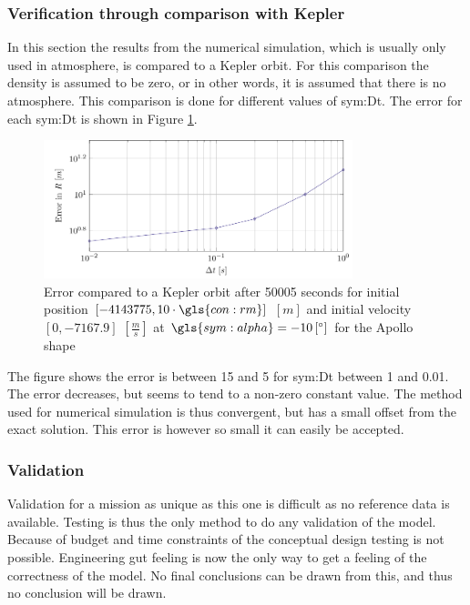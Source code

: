 \subsubsection{Verification through comparison with Kepler}
\label{sec:astroverf}

In this section the results from the numerical simulation, which is usually only used in atmosphere, is compared to a Kepler orbit. For this comparison the density is assumed to be zero, or in other words, it is assumed that there is no atmosphere. This comparison is done for different values of \gls{sym:Dt}. The error for each \gls{sym:Dt} is shown in Figure \ref{fig:kep_error}.

\begin{figure}[h]
	\centering
	\includegraphics[width=0.8\textwidth]{Figure/orbital_model/num_kep.pdf}
	\caption{Error compared to a Kepler orbit after 50005 seconds for initial position $\left[-4143775,10\cdot\gls{con:rm}\right]$ $\left[m\right]$ and initial velocity $\left[0,-7167.9\right]$ $\left[\frac{m}{s}\right]$ at $\gls{sym:alpha}=-10\left[^\circ\right]$ for the Apollo shape}
	\label{fig:kep_error}
\end{figure}

The figure shows the error is between 15 and 5 for \gls{sym:Dt} between 1 and 0.01. The error decreases, but seems to tend to a non-zero constant value. The method used for numerical simulation is thus convergent, but has a small offset from the exact solution. This error is however so small it can easily be accepted.

\subsubsection{Validation}
\label{sec:astroval}

Validation for a mission as unique as this one is difficult as no reference data is available. Testing is thus the only method to do any validation of the model. Because of budget and time constraints of the conceptual design testing is not possible. Engineering gut feeling is now the only way to get a feeling of the correctness of the model. No final conclusions can be drawn from this, and thus no conclusion will be drawn.

